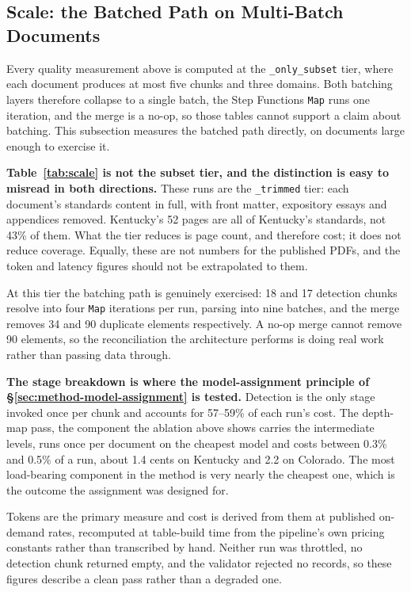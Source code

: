 \subsection{Scale: the Batched Path on Multi-Batch Documents}
\label{sec:experiments-scale}

Every quality measurement above is computed at the \texttt{\_only\_subset}
tier, where each document produces at most five chunks and three domains. Both
batching layers therefore collapse to a single batch, the Step Functions
\texttt{Map} runs one iteration, and the merge is a no-op, so those tables
cannot support a claim about batching. This subsection measures the batched
path directly, on documents large enough to exercise it.



\textbf{Table~\ref{tab:scale} is not the subset tier, and the distinction is
easy to misread in both directions.} These runs are the \texttt{\_trimmed}
tier: each document's standards content in full, with front matter, expository
essays and appendices removed. Kentucky's 52 pages are all of Kentucky's
standards, not 43\% of them. What the tier reduces is page count, and therefore
cost; it does not reduce coverage. Equally, these are not numbers for the
published PDFs, and the token and latency figures should not be extrapolated to
them.

At this tier the batching path is genuinely exercised: 18 and 17 detection
chunks resolve into four \texttt{Map} iterations per run, parsing into nine
batches, and the merge removes 34 and 90 duplicate elements respectively. A
no-op merge cannot remove 90 elements, so the reconciliation the architecture
performs is doing real work rather than passing data through.

\textbf{The stage breakdown is where the model-assignment principle of
\S\ref{sec:method-model-assignment} is tested.} Detection is the only stage
invoked once per chunk and accounts for 57--59\% of each run's cost. The
depth-map pass, the component the ablation above shows carries the
intermediate levels, runs once per document on the cheapest model and costs
between 0.3\% and 0.5\% of a run, about 1.4 cents on Kentucky and 2.2 on
Colorado. The most load-bearing
component in the method is very nearly the cheapest one, which is the outcome
the assignment was designed for.

Tokens are the primary measure and cost is derived from them at published
on-demand rates, recomputed at table-build time from the pipeline's own pricing
constants rather than transcribed by hand. Neither run was throttled, no
detection chunk returned empty, and the validator rejected no records, so these
figures describe a clean pass rather than a degraded one.

